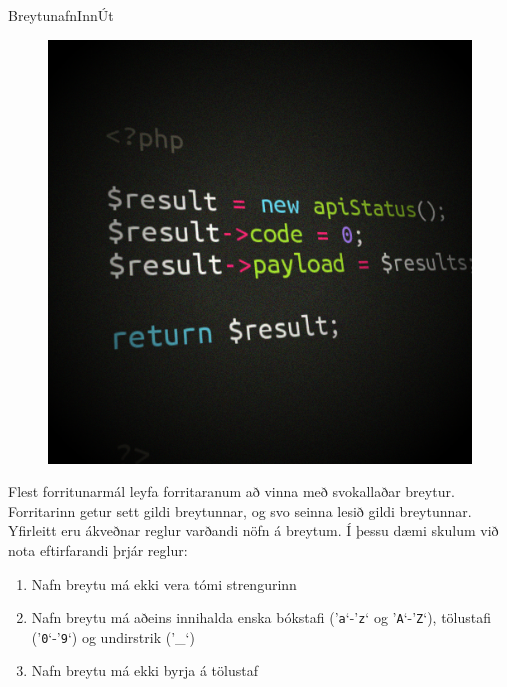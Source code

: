 \begin{problem}{Breytunafn}{Inn}{Út}{~}{~}

	\begin{figure}
		\vspace{-25pt}
		\begin{center}
			\includegraphics[scale=0.30]{../Breytunafn/code.png}
		\end{center}
		\vspace{-30pt}
	\end{figure}

	Flest forritunarmál leyfa forritaranum að vinna með svokallaðar breytur. Forritarinn getur sett gildi breytunnar, og svo seinna lesið gildi breytunnar. Yfirleitt eru ákveðnar reglur varðandi nöfn á breytum. Í þessu dæmi skulum við nota eftirfarandi þrjár reglur:

	\begin{enumerate}
		\item Nafn breytu má ekki vera tómi strengurinn
		\item Nafn breytu má aðeins innihalda enska bókstafi ('\texttt{a}`-'\texttt{z}` og '\texttt{A}`-'\texttt{Z}`), tölustafi ('\texttt{0}`-'\texttt{9}`) og undirstrik ('\_{}`)
		\item Nafn breytu má ekki byrja á tölustaf
	\end{enumerate}


\end{problem}

